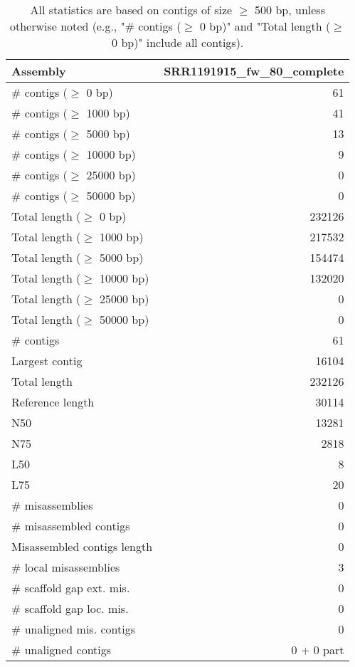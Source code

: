 \documentclass[12pt,a4paper]{article}
\begin{document}
\begin{table}[ht]
\begin{center}
\caption{All statistics are based on contigs of size $\geq$ 500 bp, unless otherwise noted (e.g., "\# contigs ($\geq$ 0 bp)" and "Total length ($\geq$ 0 bp)" include all contigs).}
\begin{tabular}{|l*{1}{|r}|}
\hline
Assembly & SRR1191915\_fw\_80\_complete \\ \hline
\# contigs ($\geq$ 0 bp) & 61 \\ \hline
\# contigs ($\geq$ 1000 bp) & 41 \\ \hline
\# contigs ($\geq$ 5000 bp) & 13 \\ \hline
\# contigs ($\geq$ 10000 bp) & 9 \\ \hline
\# contigs ($\geq$ 25000 bp) & 0 \\ \hline
\# contigs ($\geq$ 50000 bp) & 0 \\ \hline
Total length ($\geq$ 0 bp) & 232126 \\ \hline
Total length ($\geq$ 1000 bp) & 217532 \\ \hline
Total length ($\geq$ 5000 bp) & 154474 \\ \hline
Total length ($\geq$ 10000 bp) & 132020 \\ \hline
Total length ($\geq$ 25000 bp) & 0 \\ \hline
Total length ($\geq$ 50000 bp) & 0 \\ \hline
\# contigs & 61 \\ \hline
Largest contig & 16104 \\ \hline
Total length & 232126 \\ \hline
Reference length & 30114 \\ \hline
N50 & 13281 \\ \hline
N75 & 2818 \\ \hline
L50 & 8 \\ \hline
L75 & 20 \\ \hline
\# misassemblies & 0 \\ \hline
\# misassembled contigs & 0 \\ \hline
Misassembled contigs length & 0 \\ \hline
\# local misassemblies & 3 \\ \hline
\# scaffold gap ext. mis. & 0 \\ \hline
\# scaffold gap loc. mis. & 0 \\ \hline
\# unaligned mis. contigs & 0 \\ \hline
\# unaligned contigs & 0 + 0 part \\ \hline

\end{tabular}
\end{center}
\end{table}
\end{document}
